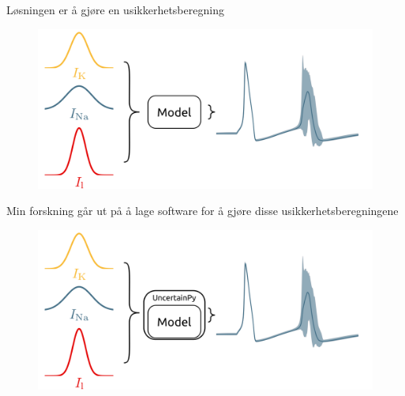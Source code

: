 \documentclass[presentation]{beamer}
\begin{document}
\begin{frame}{Løsningen er å gjøre en usikkerhetsberegning}
        \vspace{-1cm}
    \begin{figure}
       {\includegraphics[width=1.1\textwidth]{probabalistic_no_uncertainpy.png}}

    \end{figure}
\end{frame}



\begin{frame}{Min forskning går ut på å lage software for å gjøre disse usikkerhetsberegningene}
    \vspace{-1cm}
    \begin{figure}
       {\includegraphics[width=1.1\textwidth]{probabalistic.png}}

    \end{figure}
\end{frame}

\end{document}
